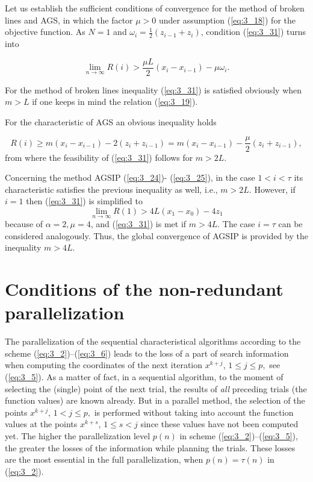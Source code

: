 	Let us establish the sufficient conditions of convergence for the method of broken lines and AGS, in which the factor $\mu >0$ under assumption  (\ref{eq:3_18}) for the objective function. As $N=1$ and $\omega _i =\frac{1}{2} (z_{i-1} +z_{i} )$, condition  (\ref{eq:3_31}) turns into 
	
	\begin{equation*}
	\mathop{\lim }\limits_{n\to \infty } R(i)>\frac{\mu L}{2} (x_{i} -x_{i-1} )-\mu \omega _i.
	\end{equation*}
	
	For the method of broken lines inequality  (\ref{eq:3_31}) is satisfied obviously when $m>L$ if one keeps in mind the relation  (\ref{eq:3_19}).
	
	For the characteristic of AGS an obvious inequality holds 
	
	\begin{equation*}
	R(i)\ge m(x_{i} -x_{i-1} )-2(z_{i} +z_{i-1} )=m(x_{i} -x_{i-1} )-\frac{\mu }{2} (z_{i} +z_{i-1} ),
	\end{equation*}
	from where the feasibility of  (\ref{eq:3_31}) follows for $m>2L$.
	
	Concerning the method AGSIP  (\ref{eq:3_24})- (\ref{eq:3_25}), in the case $1<i<\tau $ its characteristic satisfies the previous inequality as well, i.e., $m>2L$. However, if $i=1$ then  (\ref{eq:3_31}) is simplified to 
	\[\mathop{\lim }\limits_{n\to \infty } R(1)>4L(x_{1} -x_{0} )-4z_{1} \] 
	because of $\alpha =2,\mu =4$, and  (\ref{eq:3_31}) is met if $m>4L$. The case $i=\tau $ can be considered analogously. Thus, the global convergence of AGSIP is provided by the inequality $m>4L$.
	
	\noindent 
	\section{Conditions of the non-redundant parallelization}
	
	The parallelization of the sequential characteristical algorithms according to the scheme  (\ref{eq:3_2})--(\ref{eq:3_6}) leads to the loss of a part of search information when computing the coordinates of the next iteration $x^{k+j} $, $1\le j\le p,$ see  (\ref{eq:3_5}). As a matter of fact, in a sequential algorithm, to the moment of selecting the (single) point of the next trial, the results of \textit{all} preceding trials (the function values) are known already. But in a parallel method, the selection of the points $x^{k+j} $, $1<j\le p,$ is performed without taking into account the function values at the points $x^{k+s} $, $1\le s<j$ since these values have not been computed yet. The higher the parallelization level $p(n)$ in scheme  (\ref{eq:3_2})--(\ref{eq:3_5}), the greater the losses of the information while planning the trials. These losses are the most essential in the full parallelization, when $p(n)=\tau (n)$ in  (\ref{eq:3_2}).
	

